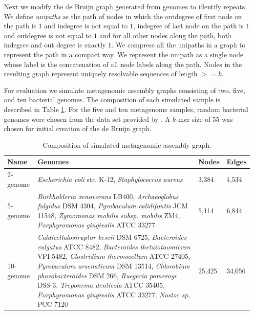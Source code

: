 \documentclass[runningheads,a4paper]{llncs}
\begin{document}
Next we modify the de Bruijn graph generated from genomes to identify repeats. We define \textit{unipaths} as the path of nodes in which the outdegree of first node on the path is $1$ and indegree is not equal to $1$, indegree of last node on the path is $1$ and outdegree is not equal to $1$ and for all other nodes along the path, both indegree and out degree is exactly $1$. We compress all the unipaths in a graph to represent the path in a compact way. We represent the unipath as a single node whose label is the concatenation of all node labels along the path.
Nodes in the resulting graph represent uniquely resolvable sequences of length $>= k$.

For evaluation we simulate metagenomic assembly graphs consisting of two, five, and ten bacterial genomes.
The composition of each simulated sample is described in Table \ref{tab:composition}.
For the five and ten metagenome samples, random bacterial genomes were chosen from the data set provided by \cite{shakya2013comparative}.
A $k$-mer size of 55 was chosen for initial creation of the de Bruijn graph.

\begin{table}[h]
\centering
\caption[]{Composition of simulated metagenomic assembly graph.}
\begin{tabularx}{\linewidth}{|l|X|l|l|}
\hline
\textbf{Name} & \textbf{Genomes} & \textbf{Nodes} & \textbf{Edges} \\
\hline
2-genome & \textit{Escherichia coli} str. K-12, \textit{Staphylococcus aureus}  & 3,384 & 4,534 \\
\hline
5-genome & \textit{Burkholderia xenovorans} LB400, \textit{Archaeoglobus fulgidus} DSM 4304,  \textit{Pyrobaculum calidifontis} JCM 11548, \textit{Zymomonas mobilis subsp. mobilis} ZM4, \textit{Porphyromonas gingivalis} ATCC 33277 & 5,114 & 6,844  \\
\hline
10-genome  & \textit{Caldicellulosiruptor bescii} DSM 6725, \textit{Bacteroides vulgatus} ATCC 8482,
\textit{Bacteroides thetaiotaomicron} VPI-5482, \textit{Clostridium thermocellum} ATCC 27405,
\textit{Pyrobaculum arsenaticum} DSM 13514, \textit{Chlorobium phaeobacteroides} DSM 266,
\textit{Ruegeria pomeroyi} DSS-3, \textit{Treponema denticola} ATCC 35405,
\textit{Porphyromonas gingivalis} ATCC 33277, \textit{Nostoc sp.} PCC 7120  & 25,425 & 34,056\\
\hline
\end{tabularx}
\label{tab:composition}
\end{table}
\end{document}
